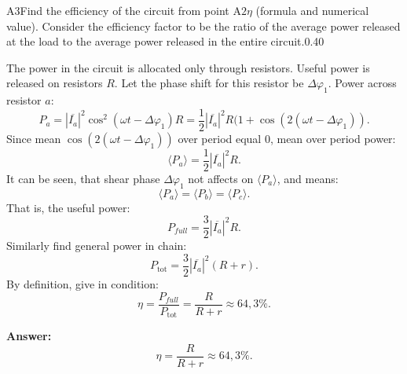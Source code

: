 \documentclass[11pt,a4paper]{article}
\begin{document}
\begin{solcard}{A3}{Find the efficiency of the circuit from point $\mathrm{A}2\eta$ (formula and numerical value). Consider the efficiency factor to be the ratio of the average power released at the load to the average power released in the entire circuit.}{0.40}

The power in the circuit is allocated only through resistors. Useful power is released on resistors $R$. Let the phase shift for this resistor be $\Delta\varphi_1$. Power across resistor $a$: $$ P_a = |\overline{I_a}|^2\cos^2(\omega t - \Delta \varphi_1)R = \frac{1}{2}|\overline{I_a}|^2R(1 + \cos(2(\omega t -  \Delta \varphi_1)). $$ Since mean $\cos(2(\omega t - \Delta \varphi_1))$ over period equal $0$, mean over period power: $$ \langle P_a \rangle = \frac{1}{2}|\overline{I_a}|^2R. $$ It can be seen, that shear phase $\Delta \varphi_1$ not affects on $\langle P_a \rangle$, and means: $$ \langle P_a \rangle = \langle P_b \rangle = \langle P_c \rangle. $$ That is, the useful power: $$ P_{full} = \frac{3}{2}|\overline{I_a}|^2R. $$ Similarly find general power in chain: $$ P_\text{tot} = \frac{3}{2}|\overline{I_a}|^2(R + r). $$ By definition, give in condition: $$ \eta = \frac{P_{full}}{P_\text{tot}} =  \frac{R}{R + r} \approx 64{,}3 \%. $$

\par\smallskip\noindent\textbf{Answer:} $$ \eta = \frac{R}{R + r}\approx 64{,}3 \%. $$
\end{solcard}
\end{document}
